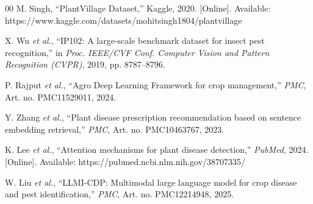 \documentclass[conference]{IEEEtran}
\begin{document}
\begin{thebibliography}{00}
M. Singh, ``PlantVillage Dataset,'' Kaggle, 2020. [Online]. Available: https://www.kaggle.com/datasets/mohitsingh1804/plantvillage

X. Wu \textit{et al.}, ``IP102: A large-scale benchmark dataset for insect pest recognition,'' in \textit{Proc. IEEE/CVF Conf. Computer Vision and Pattern Recognition (CVPR)}, 2019, pp. 8787--8796.

P. Rajput \textit{et al.}, ``Agro Deep Learning Framework for crop management,'' \textit{PMC}, Art. no. PMC11529011, 2024.

Y. Zhang \textit{et al.}, ``Plant disease prescription recommendation based on sentence embedding retrieval,'' \textit{PMC}, Art. no. PMC10463767, 2023.

K. Lee \textit{et al.}, ``Attention mechanisms for plant disease detection,'' \textit{PubMed}, 2024. [Online]. Available: https://pubmed.ncbi.nlm.nih.gov/38707335/

W. Liu \textit{et al.}, ``LLMI-CDP: Multimodal large language model for crop disease and pest identification,'' \textit{PMC}, Art. no. PMC12214948, 2025.

\end{thebibliography}
\end{document}
